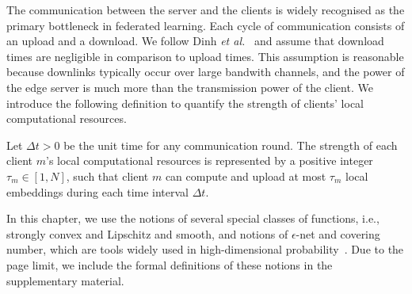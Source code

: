 The communication between the server and the clients is widely recognised as the primary bottleneck in federated learning. Each cycle of communication consists of an upload and a download. We follow Dinh \textit{et al.}~\cite{dinh2020federated} and assume that  download times are negligible in comparison to upload times. This assumption is reasonable because downlinks typically occur over large bandwith channels, and the power of the edge server is much more than the transmission power of the client. We introduce the following definition to quantify the strength of clients' local computational resources.

\begin{definition} \label{def:communication}
    Let $\Delta t > 0$ be the unit time for any communication round. The strength of each client $m$'s local computational resources is represented by a positive integer $\tau_m \in [1, N]$, such that client $m$ can compute and upload at most $\tau_m$ local embeddings during each time interval $\Delta t$. 
\end{definition}

In this chapter, we use the notions of several special classes of functions, i.e., strongly convex and Lipschitz and smooth, and notions of $\epsilon$-net and covering number, which are tools widely used in high-dimensional probability~\cite{vershynin2018high}. Due to the page limit, we include the formal definitions of these notions in the supplementary material.

